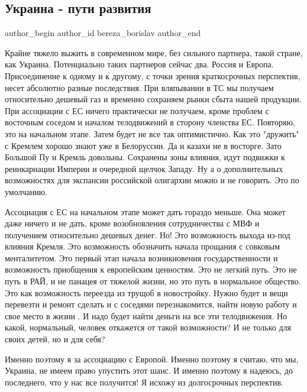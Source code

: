 
 
 
 
 
 
\subsection{Украина - пути развития}
\label{sec:23_11_2013.fb.bereza_borislav.1.ukraina_puti_razvitia}
 
\ifcmt
 author_begin
   author_id bereza_borislav
 author_end
\fi

Крайне тяжело выжить в современном мире, без сильного партнера, такой стране,
как Украина. Потенциально таких партнеров сейчас два. Россия и Европа.
Присоединение к одному и к другому, с точки зрения краткосрочных перспектив,
несет абсолютно разные последствия. При вляпывании в ТС мы получаем
относительно дешевый газ и временно сохраняем рынки сбыта нашей продукции. При
ассоциации с ЕС ничего практически не получаем, кроме проблем с восточным
соседом и  началом телодвижений в сторону членства ЕС. Повторяю, это на
начальном этапе. Затем будет не все так оптимистично. Как это "дружить" с
Кремлем хорошо знают уже в Белоруссии. Да и казахи не в восторге. Зато Большой
Пу и Кремль довольны. Сохранены зоны влияния, идут подвижки к реинкарнации
Империи и очередной щелчок Западу. Ну а о дополнительных возможностях для
экспансии российской олигархии можно и не говорить. Это по умолчанию. 

Ассоциация с ЕС на начальном этапе может дать гораздо меньше. Она может даже
ничего и не дать, кроме возобновления сотрудничества с МВФ и получением
относительно дешевых денег. Но! Это возможность выхода из-под влияния Кремля.
Это возможность обозначить начала прощания с совковым менталитетом. Это первый
этап начала возникновения государственности и возможность приобщения к
европейским ценностям. Это не легкий путь. Это не путь в РАЙ, и не панацея от
тяжелой жизни, но это путь в нормальное общество. Это как возможность переезда
из трущоб в новостройку. Нужно будет и вещи перевезти и ремонт сделать и с
соседями перезнакомится, найти новую работу и свое место в жизни . И надо будет
найти деньги на все эти телодвижения. Но какой, нормальный, человек откажется
от такой возможности? И не только для своих детей, но и для себя?

Именно поэтому я за ассоциацию с Европой. Именно поэтому я считаю, что мы,
Украина, не имеем право упустить этот шанс. И именно поэтому я надеюсь, до
последнего, что у нас все получится! Я исхожу из долгосрочных перспектив.
